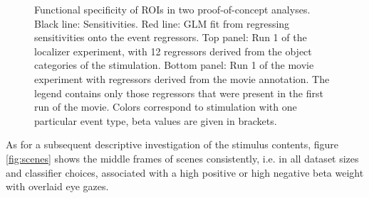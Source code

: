 \documentclass[a4paper, 12pt]{scrreprt}
\begin{document}
\begin{figure}
	\caption[Functional specificity of ROIs in two proof-of-concept analyses.]{\small{Functional specificity of ROIs in two proof-of-concept analyses. Black line: Sensitivities. Red line: GLM fit from regressing sensitivities onto the event regressors. Top panel: Run 1 of the localizer experiment, with 12 regressors derived from the object categories of the stimulation. Bottom panel: Run 1 of the movie experiment with regressors derived from the movie annotation. The legend contains only those regressors that were present in the first run of the movie. Colors correspond to stimulation with one particular event type, beta values are given in brackets.}}
	\label{fig:locsens}
\end{figure}

As for a subsequent descriptive investigation of the stimulus contents, figure \ref{fig:scenes} shows the middle frames of scenes consistently, i.e. in all dataset sizes and classifier choices, associated with a high positive or high negative beta weight with overlaid eye gazes.
\end{document}
